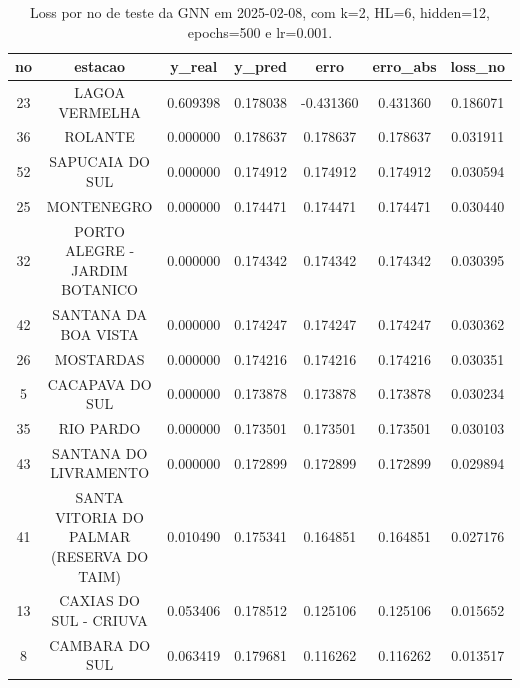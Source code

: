 \begin{table}[h]
\centering
\caption{Loss por no de teste da GNN em 2025-02-08, com k=2, HL=6, hidden=12, epochs=500 e lr=0.001.}
\label{tab:gnn_loss_k2_hl6_h12_e500_d20250208}
\begin{tabular}{ccccccc}
\toprule
no & estacao & y\_real & y\_pred & erro & erro\_abs & loss\_no \\
\midrule
23 & LAGOA VERMELHA & 0.609398 & 0.178038 & -0.431360 & 0.431360 & 0.186071 \\
36 & ROLANTE & 0.000000 & 0.178637 & 0.178637 & 0.178637 & 0.031911 \\
52 & SAPUCAIA DO SUL & 0.000000 & 0.174912 & 0.174912 & 0.174912 & 0.030594 \\
25 & MONTENEGRO & 0.000000 & 0.174471 & 0.174471 & 0.174471 & 0.030440 \\
32 & PORTO ALEGRE - JARDIM BOTANICO & 0.000000 & 0.174342 & 0.174342 & 0.174342 & 0.030395 \\
42 & SANTANA DA BOA VISTA & 0.000000 & 0.174247 & 0.174247 & 0.174247 & 0.030362 \\
26 & MOSTARDAS & 0.000000 & 0.174216 & 0.174216 & 0.174216 & 0.030351 \\
5 & CACAPAVA DO SUL & 0.000000 & 0.173878 & 0.173878 & 0.173878 & 0.030234 \\
35 & RIO PARDO & 0.000000 & 0.173501 & 0.173501 & 0.173501 & 0.030103 \\
43 & SANTANA DO LIVRAMENTO & 0.000000 & 0.172899 & 0.172899 & 0.172899 & 0.029894 \\
41 & SANTA VITORIA DO PALMAR (RESERVA DO TAIM) & 0.010490 & 0.175341 & 0.164851 & 0.164851 & 0.027176 \\
13 & CAXIAS DO SUL - CRIUVA & 0.053406 & 0.178512 & 0.125106 & 0.125106 & 0.015652 \\
8 & CAMBARA DO SUL & 0.063419 & 0.179681 & 0.116262 & 0.116262 & 0.013517 \\
\bottomrule
\end{tabular}
\end{table}
